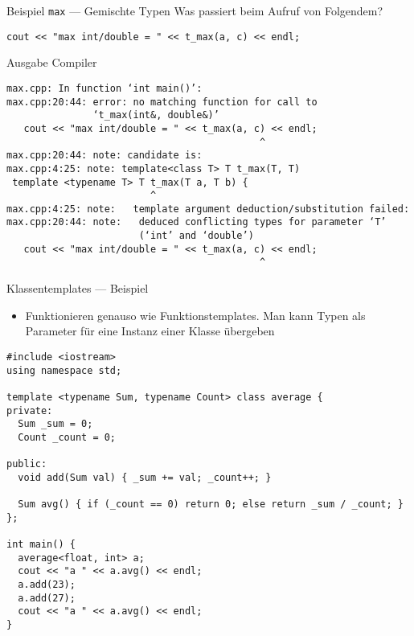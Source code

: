 \documentclass[presentation]{beamer}
\begin{document}
\begin{frame}[fragile,label={sec:org69b5e88}]{Beispiel {\color{solarizedYellow}\texttt{max} }--- Gemischte Typen}
 Was passiert beim Aufruf von Folgendem?
\begin{verbatim}
cout << "max int/double = " << t_max(a, c) << endl;
\end{verbatim}
\begin{block}{Ausgabe Compiler}
\begin{verbatim}
max.cpp: In function ‘int main()’:
max.cpp:20:44: error: no matching function for call to 
               ‘t_max(int&, double&)’
   cout << "max int/double = " << t_max(a, c) << endl;
                                            ^
max.cpp:20:44: note: candidate is:
max.cpp:4:25: note: template<class T> T t_max(T, T)
 template <typename T> T t_max(T a, T b) {
                         ^
max.cpp:4:25: note:   template argument deduction/substitution failed:
max.cpp:20:44: note:   deduced conflicting types for parameter ‘T’ 
                       (‘int’ and ‘double’)
   cout << "max int/double = " << t_max(a, c) << endl;
                                            ^
\end{verbatim}
\end{block}
\end{frame}
\begin{frame}[fragile,label={sec:org3438527}]{Klassentemplates --- Beispiel}
 \begin{itemize}
\item Funktionieren genauso wie Funktionstemplates. Man kann Typen als
Parameter für \alert{eine Instanz einer Klasse} übergeben
\end{itemize}
\begin{verbatim}
#include <iostream>
using namespace std;

template <typename Sum, typename Count> class average {
private:
  Sum _sum = 0;
  Count _count = 0;

public:
  void add(Sum val) { _sum += val; _count++; }

  Sum avg() { if (_count == 0) return 0; else return _sum / _count; }
};

int main() {
  average<float, int> a;
  cout << "a " << a.avg() << endl;
  a.add(23);
  a.add(27);
  cout << "a " << a.avg() << endl;
}
\end{verbatim}
\end{frame}
\end{document}
